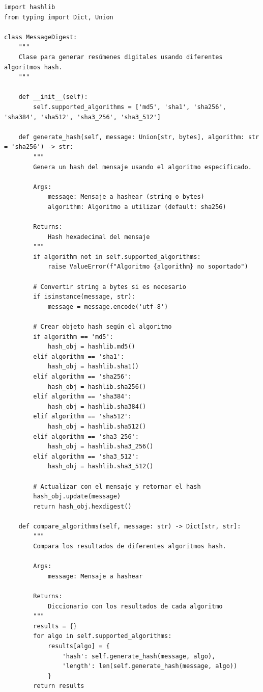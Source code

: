 \documentclass[12pt,a4paper]{article}
\begin{document}
\begin{lstlisting}[caption=Implementación de funciones hash criptográficas]
import hashlib
from typing import Dict, Union

class MessageDigest:
    """
    Clase para generar resúmenes digitales usando diferentes algoritmos hash.
    """
    
    def __init__(self):
        self.supported_algorithms = ['md5', 'sha1', 'sha256', 'sha384', 'sha512', 'sha3_256', 'sha3_512']
        
    def generate_hash(self, message: Union[str, bytes], algorithm: str = 'sha256') -> str:
        """
        Genera un hash del mensaje usando el algoritmo especificado.
        
        Args:
            message: Mensaje a hashear (string o bytes)
            algorithm: Algoritmo a utilizar (default: sha256)
            
        Returns:
            Hash hexadecimal del mensaje
        """
        if algorithm not in self.supported_algorithms:
            raise ValueError(f"Algoritmo {algorithm} no soportado")
            
        # Convertir string a bytes si es necesario
        if isinstance(message, str):
            message = message.encode('utf-8')
            
        # Crear objeto hash según el algoritmo
        if algorithm == 'md5':
            hash_obj = hashlib.md5()
        elif algorithm == 'sha1':
            hash_obj = hashlib.sha1()
        elif algorithm == 'sha256':
            hash_obj = hashlib.sha256()
        elif algorithm == 'sha384':
            hash_obj = hashlib.sha384()
        elif algorithm == 'sha512':
            hash_obj = hashlib.sha512()
        elif algorithm == 'sha3_256':
            hash_obj = hashlib.sha3_256()
        elif algorithm == 'sha3_512':
            hash_obj = hashlib.sha3_512()
            
        # Actualizar con el mensaje y retornar el hash
        hash_obj.update(message)
        return hash_obj.hexdigest()
    
    def compare_algorithms(self, message: str) -> Dict[str, str]:
        """
        Compara los resultados de diferentes algoritmos hash.
        
        Args:
            message: Mensaje a hashear
            
        Returns:
            Diccionario con los resultados de cada algoritmo
        """
        results = {}
        for algo in self.supported_algorithms:
            results[algo] = {
                'hash': self.generate_hash(message, algo),
                'length': len(self.generate_hash(message, algo))
            }
        return results
    

\end{lstlisting}
\end{document}
